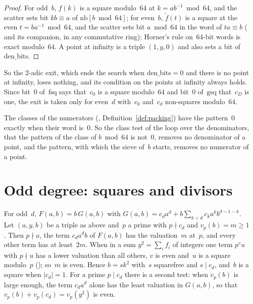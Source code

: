 \begin{proof}
  \leanok
  For odd~$b$, $f(k)$ is a square modulo~$64$ at $k = a b^{-1} \bmod 64$, and the scatter sets bit
  $k b \equiv a$ of $\mathrm{nb}[b \bmod 64]$; for even~$b$, $\tilde f(t)$ is a square at the even
  $t = b a^{-1} \bmod 64$, and the scatter sets bit $a \bmod 64$ in the word of $t a \equiv b$
  ( and its companion, in any
  commutative ring); Horner's rule on~$64$-bit words is exact modulo~$64$. A point at infinity is a
  triple $(1, y, 0)$ and also sets a bit of~$\mathrm{den\_bits}$.
\end{proof}

So the 2-adic exit, which ends the search when $\mathrm{den\_bits} = 0$ and there is no point at
infinity, loses nothing, and its condition on the points at infinity always holds. Since bit~$0$
of~$\mathrm{fsq}$ says that~$c_0$ is a square modulo~$64$ and bit~$0$ of~$\mathrm{gsq}$ that~$c_D$
is one, the exit is taken only for even~$d$ with~$c_0$ and~$c_d$ non-squares modulo~$64$.

The classes of the numerators (, Definition~\ref{def:packing})
have the pattern~$0$ exactly when their word is~$0$. So the class test of the loop over the
denominators, that the pattern of the class of $b \bmod 64$ is not~$0$, removes no denominator of a
point, and the pattern, with which the sieve of~$b$ starts, removes no numerator of a point.

\section{Odd degree: squares and divisors}\label{sec:oddDegree}

For odd~$d$, $F(a, b) = b\, G(a, b)$ with $G(a, b) = c_d a^d + b \sum_{k < d} c_k a^k b^{d-1-k}$.
Let $(a, y, b)$ be a triple as above and~$p$ a prime with $p \nmid c_d$ and $v_p(b) = m \ge 1$.
Then $p \nmid a$, the term $c_d a^d b$ of $F(a, b)$ has the valuation~$m$ at~$p$, and every other
term has at least~$2m$. When in a sum $y^2 = \sum_i f_i$ of integers one term $p^v u$ with
$p \nmid u$ has a lower valuation than all others, $v$ is even and~$u$ is a square modulo~$p$
(); so~$m$ is even. Hence
$b = s k^2$ with~$s$ squarefree and $s \mid c_d$, and~$b$ is a square when $|c_d| = 1$. For a prime
$p \mid c_d$ there is a second test: when $v_p(b)$ is large enough, the term $c_d a^d$ alone has the
least valuation in $G(a, b)$, so that $v_p(b) + v_p(c_d) = v_p(y^2)$ is even.

